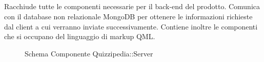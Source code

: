 \subsection{}
Racchiude tutte le componenti necessarie per il back-end del prodotto. Comunica con il database non relazionale MongoDB per ottenere le informazioni richieste dal client a cui verranno inviate successivamente.
Contiene inoltre le componenti che si occupano del linguaggio di markup QML.
\begin{figure}[H]
\centering
\noindent{}
\caption[Schema Componente Server]{Schema Componente Quizzipedia::Server}
\end{figure}
